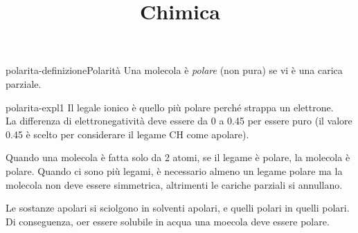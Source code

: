 \documentclass[preview]{standalone}
\begin{document}
\title{Chimica}
\genpage

\begin{snippetdefinition}{polarita-definizione}{Polarità}
    Una molecola è \textit{polare} (non pura) se vi è una carica parziale.
\end{snippetdefinition}

\begin{snippet}{polarita-expl1}
    Il legale ionico è quello più polare perché strappa un elettrone. \\
    La differenza di elettronegatività deve essere da 0 a 0.45 per essere puro
    (il valore 0.45 è scelto per considerare il legame CH come apolare).

    Quando una molecola è fatta solo da 2 atomi, 
    se il legame è polare, la molecola è polare.
    Quando ci sono più legami, è necessario almeno un legame polare
    ma la molecola non deve essere simmetrica, altrimenti le cariche parziali si annullano.

    Le sostanze apolari si sciolgono in solventi apolari, e quelli polari in quelli polari.
    Di conseguenza, oer essere solubile in acqua una moecola deve essere polare.
\end{snippet}
\end{document}
